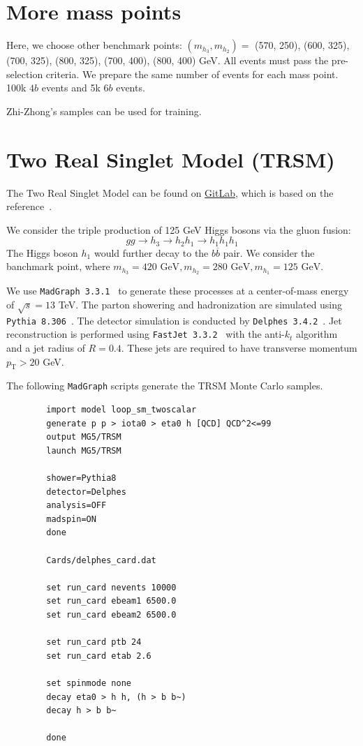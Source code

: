 \documentclass[12pt]{article}
\begin{document}
\section{More mass points}%
\label{sec:more_mass_points}
    Here, we choose other benchmark points: $(m_{h_3}, m_{h_2}) = $ (570, 250), (600, 325), (700, 325), (800, 325), (700, 400), (800, 400) GeV. All events must pass the pre-selection criteria. We prepare the same number of events for each mass point. 100k $4b$ events and 5k $6b$ events.

    Zhi-Zhong's samples can be used for training.
\section{Two Real Singlet Model (TRSM)}%
\label{sec:two_real_singlet_model_trsm_}
    The Two Real Singlet Model can be found on \href{https://gitlab.com/apapaefs/twosinglet}{GitLab}, which is based on the reference~\cite{Papaefstathiou:2020lyp}.

    We consider the triple production of 125 GeV Higgs bosons via the gluon fusion:
    \begin{equation}\label{eq:TRSM_h3_resonant_decay_chain}
        g g \to h_3 \to h_2 h_1 \to h_1h_1h_1
    \end{equation}
    The Higgs boson $h_1$ would further decay to the $b \overline{b}$ pair. We consider the banchmark point, where $m_{h_3} = \text{420 GeV}, m_{h_2} = \text{280 GeV}, m_{h_1} = \text{125 GeV}$.

    We use \verb|MadGraph 3.3.1|~\cite{Alwall:2014hca} to generate these processes at a center-of-mass energy of $\sqrt{s} = 13$ TeV. The parton showering and hadronization are simulated using \verb|Pythia 8.306|~\cite{Sjostrand:2014zea}. The detector simulation is conducted by \verb|Delphes 3.4.2|~\cite{deFavereau:2013fsa}. Jet reconstruction is performed using \verb|FastJet 3.3.2|~\cite{Cacciari:2011ma} with the anti-$k_t$ algorithm~\cite{Cacciari:2008gp} and a jet radius of $R = 0.4$. These jets are required to have transverse momentum $p_{\text{T}} > 20$ GeV.

    The following \verb|MadGraph| scripts generate the TRSM Monte Carlo samples.
    \begin{lstlisting}
        import model loop_sm_twoscalar
        generate p p > iota0 > eta0 h [QCD] QCD^2<=99
        output MG5/TRSM
        launch MG5/TRSM

        shower=Pythia8
        detector=Delphes
        analysis=OFF
        madspin=ON
        done

        Cards/delphes_card.dat

        set run_card nevents 10000
        set run_card ebeam1 6500.0
        set run_card ebeam2 6500.0

        set run_card ptb 24
        set run_card etab 2.6

        set spinmode none
        decay eta0 > h h, (h > b b~) 
        decay h > b b~

        done
    \end{lstlisting}
\end{document}
